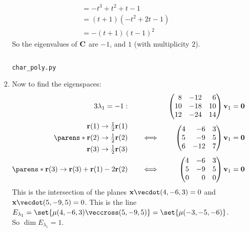 \documentclass[fleqn,a4paper,11pt]{article}
\begin{document}
\begin{enumerate}[label=\textbf{\arabic*.}]
\begin{enumerate}[label=(\textbf{\Alph*})]
\begin{enumerate}[label=(\roman*)]
\begin{align*}
         &= -t^3 + t^2 + t - 1 \\
         &= (t + 1)(-t^2 + 2t - 1) \\
         &= -(t + 1)(t - 1)^2
       \end{align*}
       So the eigenvalues of \(\mathbf{C}\) are \(-1\), and \(1\) (with multiplicity
       \(2\)).
       \begin{listing}[H]
        \inputminted{python}{char_poly.py}
        \caption{\texttt{char\_poly.py} \label{listing_py}}
       \end{listing}
      \item
       Now to find the eigenspaces:
       \begin{alignat*}3
        \lambda_1 = -1:\quad
        && &&\begin{pmatrix*}[r]
         8 & -12 & 6 \\
         10 & -18 & 10 \\
         12 & -24 & 14
        \end{pmatrix*}
        \vec v_1 &= \vec 0 \\
        \parens*{
         \begin{aligned}
          \vec r(1) &\to \tfrac 12 \vec r(1) \\
          \vec r(2) &\to \tfrac 12 \vec r(2) \\
          \vec r(3) &\to \tfrac 12 \vec r(3) \\
         \end{aligned}
        } \quad
        &&\iff{}&&\begin{pmatrix*}[r]
         4 & -6 & 3 \\
         5 & -9 & 5 \\
         6 & -12 & 7
        \end{pmatrix*}
        \vec v_1 &= \vec 0 \\
        \parens*{
         \vec r(3) \to \vec r(3) + \vec r(1) - 2\vec r(2)
        } \quad
        &&\iff{}&&\begin{pmatrix*}[r]
         4 & -6 & 3 \\
         5 & -9 & 5 \\
         0 & 0 & 0
        \end{pmatrix*}
        \vec v_1 &= \vec 0 \\
       \end{alignat*}
       This is the intersection of the planes
       \(\vec x \vecdot(4, -6, 3) = 0\) and
       \(\vec x \vecdot(5, -9, 5) = 0\). This is the line
       \(E_{\lambda_1}
         = \set{\mu (4, -6, 3) \veccross (5, -9, 5)}
         = \set{\mu (-3, -5, -6)}\). So
       \(\dim E_{\lambda_1} = 1\).


\end{enumerate}
\end{enumerate}
\end{enumerate}
\end{document}
